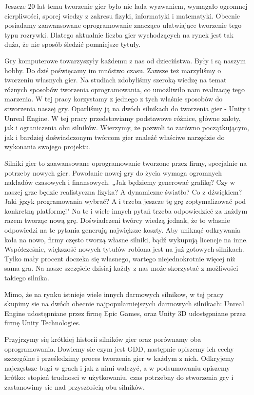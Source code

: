 \documentclass[12pt]{xmgr}
\begin{document}
Jeszcze 20 lat temu tworzenie gier było nie lada wyzwaniem, wymagało ogromnej cierpliwości, sporej wiedzy z zakresu fizyki, informatyki i matematyki. Obecnie posiadamy zaawansowane oprogramowanie znacząco ułatwiające tworzenie tego typu rozrywki. Dlatego aktualnie liczba gier wychodzących na rynek jest tak duża, że nie sposób śledzić pomniejsze tytuły.

Gry komputerowe towarzyszyły każdemu z nas od dzieciństwa. Były i są naszym hobby. Do dziś poświęcamy im mnóstwo czasu. Zawsze też marzyliśmy o tworzeniu własnych gier. Na studiach zdobyliśmy szeroką wiedzę na temat różnych sposobów tworzenia oprogramowania, co umożliwiło nam realizację tego marzenia. W tej pracy korzystamy z jednego z tych właśnie sposobów do stworzenia naszej gry. Oparliśmy ją na dwóch silnikach do tworzenia gier - Unity i Unreal Engine. W tej pracy przedstawiamy podstawowe różnice, główne zalety, jak i ograniczenia obu silników. Wierzymy, że pozwoli to zarówno początkującym, jak i bardziej doświadczonym twórcom gier znaleźć właściwe narzędzie do wykonania swojego projektu.

Silniki gier to zaawansowane oprogramowanie tworzone przez firmy, specjalnie na potrzeby nowych gier. Powołanie nowej gry do życia wymaga ogromnych nakładów czasowych i finansowych. „Jak będziemy generować grafikę? Czy w naszej grze będzie realistyczna fizyka? A dynamiczne światło? Co z dźwiękiem? Jaki język programowania wybrać? A i trzeba jeszcze tę grę zoptymalizować pod konkretną platformę!" Na te i wiele innych pytań trzeba odpowiedzieć za każdym razem tworząc nową grę. Doświadczeni twórcy wiedzą jednak, że to własnie odpowiedzi na te pytania generują największe koszty. Aby uniknąć odkrywania koła na nowo, firmy często tworzą własne silniki, bądź wykupują licencje na inne. Współcześnie, większość nowych tytułów robiona jest na już gotowych silnikach. Tylko mały procent doczeka się własnego, wartego niejednokrotnie więcej niż sama gra. Na nasze szczęście dzisiaj każdy z nas może skorzystać z możliwości takiego silnika.

Mimo, że na rynku istnieje wiele innych darmowych silnikow, w tej pracy skupimy sie na dwóch obecnie najpopularniejszych darmowych silnikach:
Unreal Engine udostępniane przez firmę Epic Games, oraz Unity 3D udostępniane przez firmę Unity Technologies.

Przyjrzymy się krótkiej historii silników gier oraz porównamy oba oprogramowania. Dowiemy sie czym jest GDD, następnie opiszemy ich cechy szczególne i prześledzimy  proces tworzenia gier w każdym z nich. Odkryjemy najczęstsze bugi w grach i jak z nimi walczyć, a w podsumowaniu opiszemy krótko: stopień trudnosci w użytkowaniu, czas potrzebny do stworzenia gry i zastanowimy sie nad przyszłością obu silników.
\end{document}
